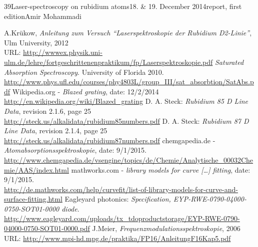\documentclass[a4paper, parskip=half, 12pt, bibliography=totocnumbered]{scrartcl}
\begin{document}
{39}{Laser-spectroscopy on rubidium atoms}{18. \& 19. December 2014}{report, first edition}{Amir Mohammadi}{}





\begin{thebibliography}{10}
 A.Krükow, \emph{Anleitung zum Versuch ``Laserspektroskopie der Rubidium D2-Linie''}, Ulm University, 2012\\
URL: \url{http://wwwex.physik.uni-ulm.de/lehre/fortgeschrittenenpraktikum/fp/Laserspektroskopie.pdf}
 \emph{Saturated Absorption Spectroscopy}. University of Florida 2010.\\
\url{http://www.phys.ufl.edu/courses/phy4803L/group_III/sat_absorbtion/SatAbs.pdf}
 Wikipedia.org - \emph{Blazed grating}, date: 12/2/2014\\
\url{http://en.wikipedia.org/wiki/Blazed_grating}
 D. A. Steck: \emph{Rubidium 85 D Line Data}, revision 2.1.6, page 25\\
\url{http://steck.us/alkalidata/rubidium85numbers.pdf}
 D. A. Steck: \emph{Rubidium 87 D Line Data}, revision 2.1.4, page 25\\
\url{http://steck.us/alkalidata/rubidium87numbers.pdf}
 chemgapedia.de - \emph{Atomabsorptionsspektroskopie}, date: 9/1/2015.\\
\url{http://www.chemgapedia.de/vsengine/topics/de/Chemie/Analytische_00032Chemie/AAS/index.html}
 mathworks.com - \emph{library models for curve [\dots] fitting}, date: 9/1/2015.\\
\url{http://de.mathworks.com/help/curvefit/list-of-library-models-for-curve-and-surface-fitting.html}
 Eagleyard photonics: \emph{Specification, EYP-RWE-0790-04000-0750-SOT01-0000 diode}.\\
\url{http://www.eagleyard.com/uploads/tx_tdoproductstorage/EYP-RWE-0790-04000-0750-SOT01-0000.pdf}
 J.Meier, \emph{Frequenzmodulationsspektroskopie}, 2006\\
URL: \url{http://www.mpi-hd.mpg.de/praktika/FP16/AnleitungF16Kap5.pdf}
\end{thebibliography}
\end{document}
